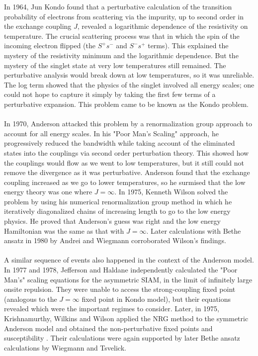 \documentclass[twoside]{report}
\numberwithin{equation}{section}
\begin{document}
In 1964, Jun Kondo\cite{Kondo} found that a perturbative calculation of the transition probability of electrons from scattering via the impurity, up to second order in the exchange coupling \(J\), revealed a logarithmic dependence of the resistivity on temperature.
The crucial scattering process was that in which the spin of the incoming electron flipped (the \(S^+ s^-\) and \(S^- s^+\) terms).
This explained the mystery of the resistivity minimum and the logarithmic dependence.
But the mystery of the singlet state at very low temperatures still remained.
The perturbative analysis would break down at low temperatures, so it was unreliable.
The log term showed that the physics of the singlet involved all energy scales; one could not hope to capture it simply by taking the first few terms of a perturbative expansion.
This problem came to be known as the Kondo problem.
\\\\ In 1970, Anderson attacked this problem by a renormalization group approach to account for all energy scales.
In his "Poor Man's Scaling" approach, he progressively reduced the bandwidth while taking account of the eliminated states into the couplings via second order perturbation theory.
This showed how the couplings would flow as we went to low temperatures, but it still could not remove the divergence as it was perturbative.
Anderson found that the exchange coupling increased as we go to lower temperatures, so he surmised that the low energy theory was one where \(J=\infty\).
In 1975, Kenneth Wilson solved the problem by using his numerical renormalization group method in which he iteratively diagonalized chains of increasing length to go to the low energy physics.
He proved that Anderson's guess was right and the low energy Hamiltonian was the same as that with \(J=\infty\).
Later calculations with Bethe ansatz in 1980 by Andrei and Wiegmann \cite{andrei_kondo,wiegmann} corroborated Wilson's findings.
\\\\ A similar sequence of events also happened in the context of the Anderson model. In 1977 and 1978, Jefferson and Haldane independently calculated the "Poor Man's" scaling equations for the asymmetric SIAM, in the limit of infinitely large onsite repulsion. They were unable to access the strong-coupling fixed point (analogous to the \(J=\infty\) fixed point in Kondo model), but their equations revealed which were the important regimes to consider. Later, in 1975, Krishnamurthy, Wilkins and Wilson applied the NRG method to the symmetric Anderson model and obtained the non-perturbative fixed points and susceptibility \cite{hrk-nrg}. Their calculations were again supported by later Bethe ansatz calculations by Wiegmann and Tsvelick\cite{Tsvelick}.
\end{document}

